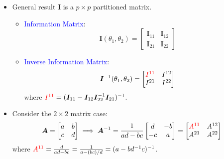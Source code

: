 \documentclass[oneside]{book}\usepackage[]{graphicx}\usepackage[svgnames]{xcolor}
\providecommand{\Matrix}[1]{\bm{#1}}
\begin{document}
\begin{itemize}
    \item General result $ \Matrix{I} $ is a $ p\times p $ partitioned matrix.
          \begin{itemize}
              \item \textcolor{Blue}{Information Matrix}:
                    \[ \Matrix{I}(\theta_1,\theta_2)=\begin{bmatrix}
                            \Matrix{I}_{11} & \Matrix{I}_{12} \\
                            \Matrix{I}_{21} & \Matrix{I}_{22}
                        \end{bmatrix} \]
              \item \textcolor{Blue}{Inverse Information Matrix}:
                    \[ \Matrix{I}^{-1}(\theta_1,\theta_2)=\begin{bmatrix}
                            \textcolor{Red}{I^{11}} & I^{12} \\
                            I^{21}                  & I^{22}
                        \end{bmatrix} \]
                    where $ \textcolor{Red}{I^{11}}=(\Matrix{I}_{11}-\Matrix{I}_{12}\Matrix{I}_{22}^{-1}\Matrix{I}_{21})^{-1} $.
          \end{itemize}
    \item Consider the $ 2\times 2 $ matrix case:
          \[ \Matrix{A}=\begin{bmatrix}
                  a & b \\
                  c & d
              \end{bmatrix}\implies \Matrix{A}^{-1}=\frac{1}{ad-bc} \begin{bmatrix}
                  d  & -b \\
                  -c & a
              \end{bmatrix}=\begin{bmatrix}
                  \textcolor{Red}{A^{11}} & A^{12} \\
                  A^{21}                  & A^{22}
              \end{bmatrix} \]
          where $ \textcolor{Red}{A^{11}}=\frac{d}{ad-bc}=\frac{1}{a-(bc)/d}=(a-bd^{-1}c)^{-1} $.
\end{itemize}
\end{document}
